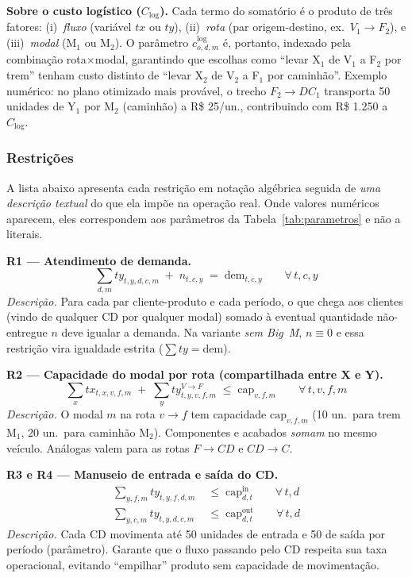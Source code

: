 \documentclass[11pt,a4paper]{article}
\begin{document}
\noindent\textbf{Sobre o custo logístico (\boldmath$C_{\text{log}}$).} Cada termo do somatório é o produto de três fatores: (i)~\emph{fluxo} (variável $tx$ ou $ty$), (ii)~\emph{rota} (par origem-destino, ex.\ $V_1{\to}F_2$), e (iii)~\emph{modal} (M$_1$ ou M$_2$). O parâmetro $c^{\text{log}}_{o,d,m}$ é, portanto, indexado pela combinação rota$\times$modal, garantindo que escolhas como ``levar X$_1$ de V$_1$ a F$_2$ por trem'' tenham custo distinto de ``levar X$_2$ de V$_2$ a F$_1$ por caminhão''. Exemplo numérico: no plano otimizado mais provável, o trecho $F_2{\to}DC_1$ transporta 50 unidades de Y$_1$ por M$_2$ (caminhão) a R\$ 25/un., contribuindo com R\$ 1.250 a $C_{\text{log}}$.

\subsubsection*{Restrições}
A lista abaixo apresenta cada restrição em notação algébrica seguida de \emph{uma descrição textual} do que ela impõe na operação real. Onde valores numéricos aparecem, eles correspondem aos parâmetros da Tabela~\ref{tab:parametros} e não a literais.

\medskip
\noindent\textbf{R1 — Atendimento de demanda.}
\begin{equation}
\sum_{d,m} ty_{t,y,d,c,m} \;+\; n_{t,c,y} \;=\; \text{dem}_{t,c,y} \qquad \forall\,t,c,y
\label{eq:R1}
\end{equation}
\emph{Descrição.} Para cada par cliente-produto e cada período, o que chega aos clientes (vindo de qualquer CD por qualquer modal) somado à eventual quantidade não-entregue $n$ deve igualar a demanda. Na variante \emph{sem Big~M}, $n \equiv 0$ e essa restrição vira igualdade estrita ($\sum ty = \text{dem}$).

\medskip
\noindent\textbf{R2 — Capacidade do modal por rota (compartilhada entre X e Y).}
\begin{equation}
\sum_{x} tx_{t,x,v,f,m} \;+\; \sum_{y} ty^{V\to F}_{t,y,v,f,m} \;\leq\; \text{cap}_{v,f,m} \qquad \forall\,t,v,f,m
\label{eq:R2}
\end{equation}
\emph{Descrição.} O modal $m$ na rota $v{\to}f$ tem capacidade $\text{cap}_{v,f,m}$ (10 un.\ para trem M$_1$, 20 un.\ para caminhão M$_2$). Componentes e acabados \emph{somam} no mesmo veículo. Análogas valem para as rotas $F{\to}CD$ e $CD{\to}C$.

\medskip
\noindent\textbf{R3 e R4 — Manuseio de entrada e saída do CD.}
\begin{align}
\sum_{y,f,m} ty_{t,y,f,d,m} &\;\leq\; \text{cap}^{\text{in}}_{d,t} \qquad \forall\,t,d \label{eq:R3}\\
\sum_{y,c,m} ty_{t,y,d,c,m} &\;\leq\; \text{cap}^{\text{out}}_{d,t} \qquad \forall\,t,d \label{eq:R4}
\end{align}
\emph{Descrição.} Cada CD movimenta até 50 unidades de entrada e 50 de saída por período (parâmetro). Garante que o fluxo passando pelo CD respeita sua taxa operacional, evitando ``empilhar'' produto sem capacidade de movimentação.
\end{document}
